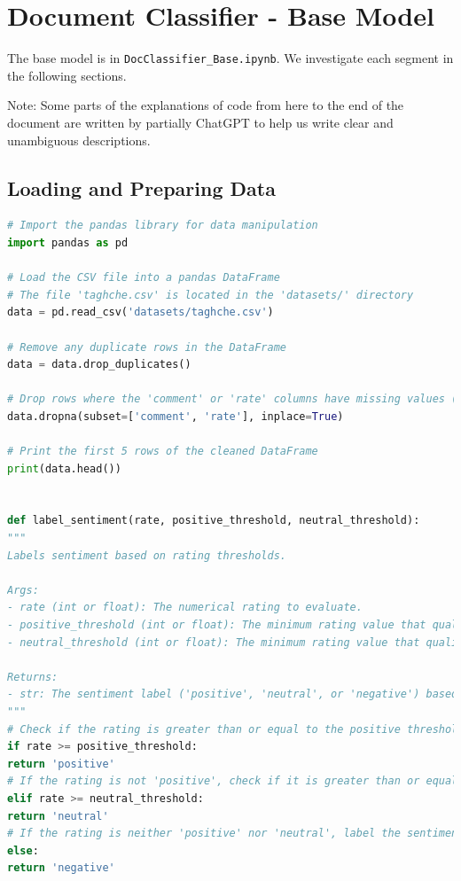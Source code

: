 \documentclass{solutionclass} %
\def\co#1{\texttt{#1}}
\begin{document}
\section{Document Classifier -  Base Model}

The base model is in \co{DocClassifier\_Base.ipynb}. We investigate each segment in the following sections.



Note: Some parts of the explanations of code from here to the end of the document are written by partially ChatGPT to help us write clear and unambiguous descriptions.


\subsection*{Loading and Preparing Data}


\begin{lstlisting}[language=Python]
# Import the pandas library for data manipulation
import pandas as pd

# Load the CSV file into a pandas DataFrame
# The file 'taghche.csv' is located in the 'datasets/' directory
data = pd.read_csv('datasets/taghche.csv')

# Remove any duplicate rows in the DataFrame
data = data.drop_duplicates()

# Drop rows where the 'comment' or 'rate' columns have missing values (NaN)
data.dropna(subset=['comment', 'rate'], inplace=True)

# Print the first 5 rows of the cleaned DataFrame
print(data.head())


def label_sentiment(rate, positive_threshold, neutral_threshold):
"""
Labels sentiment based on rating thresholds.

Args:
- rate (int or float): The numerical rating to evaluate.
- positive_threshold (int or float): The minimum rating value that qualifies as 'positive'.
- neutral_threshold (int or float): The minimum rating value that qualifies as 'neutral'; ratings below this are considered 'negative'.

Returns:
- str: The sentiment label ('positive', 'neutral', or 'negative') based on the rating.
"""
# Check if the rating is greater than or equal to the positive threshold
if rate >= positive_threshold:
return 'positive'
# If the rating is not 'positive', check if it is greater than or equal to the neutral threshold
elif rate >= neutral_threshold:
return 'neutral'
# If the rating is neither 'positive' nor 'neutral', label the sentiment as 'negative'
else:
return 'negative'
\end{lstlisting}
\end{document}
